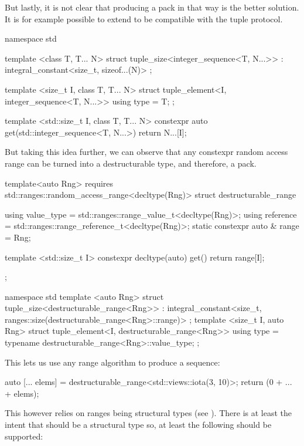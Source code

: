 \documentclass{wg21}
\begin{document}
But lastly, it is not clear that producing a pack in that way is the better solution.
It is for example possible to extend  to be compatible with the tuple protocol.

\begin{colorblock}
namespace std {
    template <class T, T... N>
    struct tuple_size<integer_sequence<T, N...>>
    : integral_constant<size_t, sizeof...(N)>
    { };

    template <size_t I,  class T, T... N>
    struct tuple_element<I, integer_sequence<T, N...>> {
        using type = T;
    };

    template <std::size_t I,  class T, T... N>
    constexpr auto get(std::integer_sequence<T, N...>) {
        return N...[I];
    }
}
\end{colorblock}

But taking this idea further, we can observe that any constexpr random access range can be turned into a destructurable type, and therefore, a pack.

\begin{colorblock}
template<auto Rng>
requires std::ranges::random_access_range<decltype(Rng)>
struct destructurable_range {
    using value_type = std::ranges::range_value_t<decltype(Rng)>;
    using reference  = std::ranges::range_reference_t<decltype(Rng)>;
    static constexpr auto & range = Rng;

    template <std::size_t I>
    constexpr decltype(auto) get() {
        return range[I];
    }
};

namespace std {
    template <auto Rng>
    struct tuple_size<destructurable_range<Rng>>
    : integral_constant<size_t, ranges::size(destructurable_range<Rng>::range)>
    { };
    template <size_t I,  auto Rng>
    struct tuple_element<I, destructurable_range<Rng>> {
        using type = typename destructurable_range<Rng>::value_type;
    };
}
\end{colorblock}

This lets us use any range algorithm to produce a sequence:

\begin{colorblock}
auto [... elems] = destructurable_range<std::views::iota(3, 10)>{};
return (0 + ... + elems);
\end{colorblock}


This however relies on ranges being structural types (see ).
There is at least the intent that  should be a structural type so, at least the following should be supported:
\end{document}
